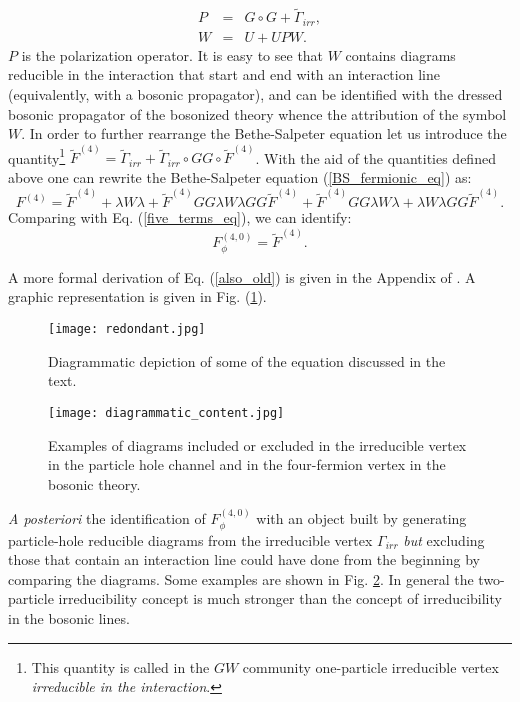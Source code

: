\documentclass[a4paper,11pt]{article}
\begin{document}
\begin{eqnarray}
P& =& G\circ G + \tilde \Gamma_{irr}, \\
W & = & U + U P W  . 
\end{eqnarray}  
$P$ is the polarization operator.
It is easy to see that $W$ contains diagrams reducible in the interaction that start and end with an interaction line (equivalently, with a bosonic propagator), and can be identified with the dressed bosonic propagator of the bosonized theory whence the attribution of the symbol $W$. 
In order to further rearrange the Bethe-Salpeter equation let us introduce the quantity\footnote{This quantity is called in the $GW$ community one-particle irreducible vertex {\sl irreducible in the interaction}.} $\tilde F^{(4)} = \tilde \Gamma_{irr} + \tilde \Gamma_{irr}\circ G G\circ \tilde F^{(4)}$.
With the aid of the quantities defined above one can rewrite the Bethe-Salpeter equation (\ref{BS_fermionic_eq}) as: 
\begin{equation}
\label{also_old}  
F^{(4)} = \tilde F^{(4)} + \lambda W \lambda + \tilde F^{(4)} G G  \lambda W \lambda G G \tilde F^{(4)}+\tilde F^{(4)} G G  \lambda W \lambda+ \lambda W \lambda G G \tilde F^{(4)}.  
\end{equation}  
Comparing with Eq. (\ref{five_terms_eq}), we can identify: 
\begin{equation}
F_\phi^{(4,0)} = \tilde F^{(4)}. 
\end{equation} 

A more formal derivation of Eq. (\ref{also_old}) is given in the Appendix of \cite{Held2011}.
A graphic representation is given in Fig. (\ref{ridondante}). 
\begin{figure} 
\texttt{[image: redondant.jpg]}
\caption{Diagrammatic depiction of some of the equation discussed in the text.} \label{ridondante} 

\end{figure} 
\begin{figure} 
\texttt{[image: diagrammatic\_content.jpg]}
\caption{Examples of diagrams included or excluded in the irreducible vertex in the particle hole channel and in the four-fermion vertex in the bosonic theory.} \label{aposteriori} 

\end{figure} 
{\sl A  posteriori}  the identification of $F^{(4,0)}_\phi$ with an object built by generating particle-hole reducible diagrams from the irreducible vertex $\Gamma_{irr}$ {\sl but} excluding those that contain an interaction line could have done from the beginning by comparing the diagrams. 
Some examples are shown in Fig. \ref{aposteriori}. In general the two-particle irreducibility concept is much stronger than the concept of irreducibility in the bosonic lines.  
\end{document}

